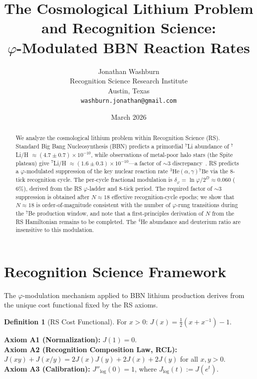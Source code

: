 \documentclass[12pt,a4paper]{article}
\title{The Cosmological Lithium Problem and Recognition Science:\\
$\varphi$-Modulated BBN Reaction Rates}
\author{Jonathan Washburn\\
Recognition Science Research Institute\\
Austin, Texas\\
\texttt{washburn.jonathan@gmail.com}}
\date{March 2026}
\theoremstyle{definition}
\newtheorem{definition}[theorem]{Definition}
\theoremstyle{remark}
\begin{document}
\maketitle

\begin{abstract}
We analyze the cosmological lithium problem within Recognition Science
(RS).  Standard Big Bang Nucleosynthesis (BBN) predicts a primordial
$^7$Li abundance of $^7$Li/H $\approx (4.7 \pm 0.7) \times 10^{-10}$,
while observations of metal-poor halo stars (the Spite plateau) give
$^7$Li/H $\approx (1.6 \pm 0.3) \times 10^{-10}$---a factor of $\sim
3$ discrepancy~\cite{Cyburt2016,Fields2011}.  RS predicts a
$\varphi$-modulated suppression of the key nuclear reaction rate
${}^3\mathrm{He}(\alpha,\gamma){}^7\mathrm{Be}$ via the 8-tick
recognition cycle.  The per-cycle fractional modulation is
$\delta_\varphi = \ln\varphi / 2^D \approx 0.060$ ($6\%$), derived
from the RS $\varphi$-ladder and 8-tick period.  The required factor
of $\sim 3$ suppression is obtained after $N \approx 18$ effective
recognition-cycle epochs; we show that $N \approx 18$ is
order-of-magnitude consistent with the number of $\varphi$-rung
transitions during the ${}^7$Be production window, and note that a
first-principles derivation of $N$ from the RS Hamiltonian remains to
be completed.  The $^4$He abundance and deuterium ratio are insensitive
to this modulation.
\end{abstract}

\section{Recognition Science Framework}
\label{sec:framework}

The $\varphi$-modulation mechanism applied to BBN lithium production
derives from the unique cost functional fixed by the RS axioms.

\begin{definition}[RS Cost Functional]
For $x > 0$: $J(x) = \tfrac{1}{2}(x + x^{-1}) - 1$.
\end{definition}

\noindent\textbf{Axiom A1 (Normalization):} $J(1) = 0$.\\
\textbf{Axiom A2 (Recognition Composition Law, RCL):}
$J(xy)+J(x/y)=2J(x)J(y)+2J(x)+2J(y)$ for all $x,y>0$.\\
\textbf{Axiom A3 (Calibration):} $J''_{\log}(0) = 1$, where
$J_{\log}(t) := J(e^t)$.
\end{document}
